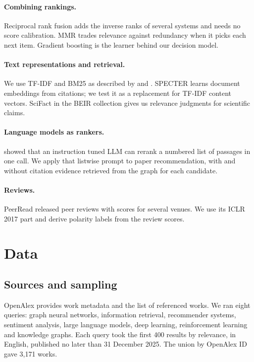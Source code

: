 \documentclass[11pt,a4paper]{article}
\begin{document}
\paragraph{Combining rankings.} Reciprocal rank fusion \citep{cormack2009} adds the inverse ranks of several systems and needs no score calibration. MMR \citep{carbonell1998} trades relevance against redundancy when it picks each next item. Gradient boosting \citep{friedman2001} is the learner behind our decision model.

\paragraph{Text representations and retrieval.} We use TF-IDF and BM25 as described by \citet{manning2008} and \citet{robertson2009}. SPECTER \citep{cohan2020} learns document embeddings from citations; we test it as a replacement for TF-IDF content vectors. SciFact \citep{wadden2020} in the BEIR collection \citep{thakur2021} gives us relevance judgments for scientific claims.

\paragraph{Language models as rankers.} \citet{sun2023rankgpt} showed that an instruction tuned LLM can rerank a numbered list of passages in one call. We apply that listwise prompt to paper recommendation, with and without citation evidence retrieved from the graph for each candidate.

\paragraph{Reviews.} PeerRead \citep{kang2018,peerreadrepo} released peer reviews with scores for several venues. We use its ICLR 2017 part and derive polarity labels from the review scores.

\section{Data}\label{sec:data}
\subsection{Sources and sampling}
OpenAlex \citep{openalex} provides work metadata and the list of referenced works. We ran eight queries: graph neural networks, information retrieval, recommender systems, sentiment analysis, large language models, deep learning, reinforcement learning and knowledge graphs. Each query took the first 400 results by relevance, in English, published no later than 31 December 2025. The union by OpenAlex ID gave 3,171 works.
\end{document}
